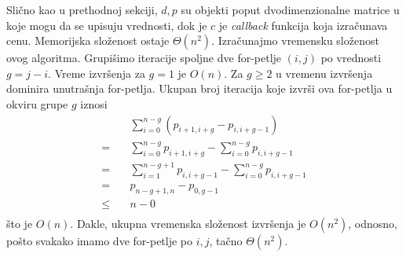 \documentclass[a4paper,12pt]{article}
\numberwithin{equation}{subsection}
\begin{document}
Sli\v cno kao u prethodnoj sekciji, $d, p$ su objekti poput dvodimenzionalne matrice u koje mogu da se upisuju vrednosti, dok je $c$ je \textit{callback} funkcija koja izra\v cunava cenu. Memorijska slo\v zenost ostaje $\Theta(n^2)$. Izra\v cunajmo vremensku slo\v zenost ovog algoritma. Grupi\v simo iteracije spoljne dve for-petlje $(i, j)$ po vrednosti $g = j-i$. Vreme izvr\v senja za $g = 1$ je $O(n)$. Za $g \geq 2$ u vremenu izvr\v senja dominira unutra\v snja for-petlja. Ukupan broj iteracija koje izvr\v si ova for-petlja u okviru grupe $g$ iznosi
\begin{align}
 & \quad \sum_{i=0}^{n-g} (p_{i+1, i+g} - p_{i, i+g-1}) \nonumber \\
=& \quad \sum_{i=0}^{n-g} p_{i+1, i+g} - \sum_{i=0}^{n-g} p_{i, i+g-1} \nonumber \\
=& \quad \sum_{i=1}^{n-g+1} p_{i, i+g-1} - \sum_{i=0}^{n-g} p_{i, i+g-1} \nonumber \\
=& \quad p_{n-g+1, n} - p_{0, g-1} \nonumber \\
\leq & \quad n - 0 \nonumber \\
\end{align}
\v sto je $O(n)$. Dakle, ukupna vremenska slo\v zenost izvr\v senja je $O(n^2)$, odnosno, po\v sto svakako imamo dve for-petlje po $i,j$, ta\v cno $\Theta(n^2)$.
\\
\end{document}
